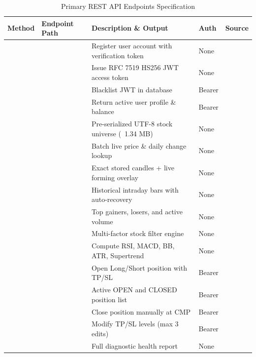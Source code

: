 \begin{table}[htbp]
\centering
\small
\sffamily
\caption{Primary REST API Endpoints Specification}
\label{tab:core_api_endpoints}
\begin{tabularx}{\linewidth}{p{14mm} p{44mm} Y p{14mm} p{26mm}}
\toprule
\textbf{Method} & \textbf{Endpoint Path} & \textbf{Description \& Output} & \textbf{Auth} & \textbf{Source} \\
\midrule
{} &  & Register user account with verification token & None &  \\
 &  & Issue RFC 7519 HS256 JWT access token & None &  \\
 &  & Blacklist JWT  in database & Bearer &  \\
  &  & Return active user profile \& balance & Bearer &  \\
  &  & Pre-serialized UTF-8 stock universe (~1.34 MB) & None &  \\
 &  & Batch live price \& daily change lookup & None &  \\
  &  & Exact stored candles + live forming overlay & None &  \\
  &  & Historical intraday bars with auto-recovery & None &  \\
  &  & Top gainers, losers, and active volume & None &  \\
  &  & Multi-factor stock filter engine & None &  \\
  &  & Compute RSI, MACD, BB, ATR, Supertrend & None &  \\
 &  & Open Long/Short position with TP/SL & Bearer &  \\
  &  & Active OPEN and CLOSED position list & Bearer &  \\
 &  & Close position manually at CMP & Bearer &  \\
  &  & Modify TP/SL levels (max 3 edits) & Bearer &  \\
  &  & Full diagnostic health report & None &  \\
\bottomrule
\end{tabularx}
\end{table}
